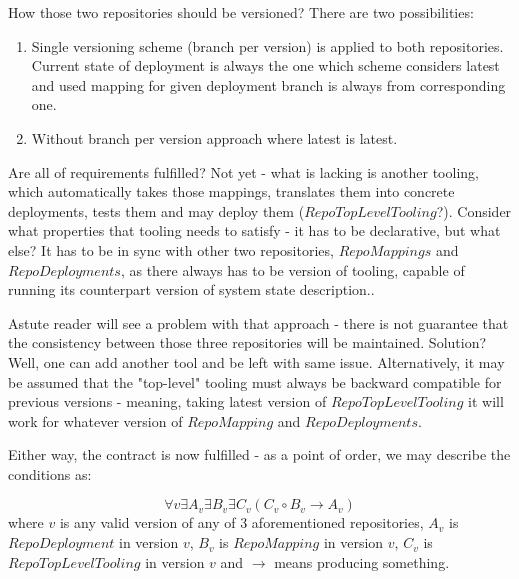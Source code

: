 \documentclass{article}
\begin{document}
How those two repositories should be versioned? There are two possibilities:
\begin{enumerate}
	\item Single versioning scheme (branch per version) is applied to both repositories. Current state of deployment is always the one which scheme considers latest and used mapping for given deployment branch is always from corresponding one.
	\item Without branch per version approach where latest is latest. 
\end{enumerate}

Are all of requirements fulfilled? Not yet - what is lacking is another  tooling, which automatically takes those mappings, translates them into concrete deployments, tests them and may deploy them ($RepoTopLevelTooling$?).
Consider what properties that tooling needs to satisfy - it has to be declarative, but what else? It has to be in sync with other two repositories, $RepoMappings$ and $RepoDeployments$, as there always
has to be version of tooling, capable of running its counterpart version of system state description..

Astute reader will see a problem with that approach - there is not guarantee that the consistency between those three repositories will be maintained. Solution? Well, one can add another tool and be left with same issue.
Alternatively, it may be assumed that the "top-level" tooling must always be backward compatible for previous versions - meaning, taking latest version of $RepoTopLevelTooling$ it will work for whatever version of $RepoMapping$ and $RepoDeployments$.

Either way, the contract is now fulfilled - as a point of order, we may describe the conditions as:

\begin{equation}
	\forall v \exists A_v \exists B_v \exists C_v (C_v \circ B_v \rightarrow A_v)
\end{equation}
where $v$ is any valid version of any of 3 aforementioned repositories, $A_v$ is $RepoDeployment$ in version $v$,
$B_v$ is $RepoMapping$ in version $v$, $C_v$ is $RepoTopLevelTooling$ in version $v$ and $\rightarrow$ means producing something.
\end{document}
